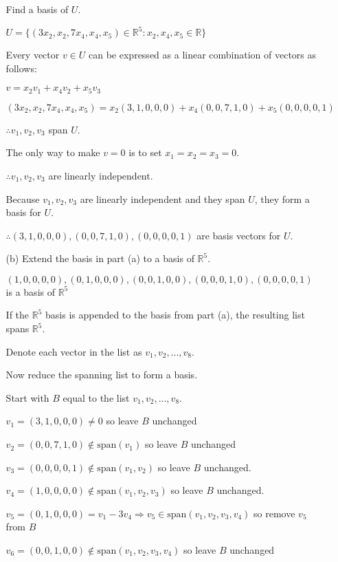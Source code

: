 \documentclass[fleqn]{article}
\begin{document}
\begin{enumerate}[nolistsep]
\begin{enumerate}[nolistsep]
				Find a basis of $U$.
				
				$U = \{(3x_2, x_2, 7x_4, x_4, x_5) \in \mathbb{R}^5 : x_2, x_4, x_5 \in \mathbb{R}\}$
				
				Every vector $v \in U$ can be expressed as a linear combination of vectors as follows:
				
				$v = x_2v_1 + x_4v_2 + x_5v_3$
				
				$(3x_2, x_2, 7x_4, x_4, x_5) = x_2(3, 1, 0, 0, 0) + x_4(0, 0, 7, 1, 0) + x_5(0, 0, 0, 0, 1)$
				
				$\therefore v_1, v_2, v_3$ span $U$.
									
				The only way to make $v = 0$ is to set $x_1 = x_2 = x_3 = 0$.
				
				$\therefore v_1, v_2, v_3$ are linearly independent.
				
				Because $v_1, v_2, v_3$ are linearly independent and they span $U$, they form a basis for $U$.
				
				$\therefore (3, 1, 0, 0, 0), (0, 0, 7, 1, 0), (0, 0, 0, 0, 1)$ are basis vectors for $U$.
				
				\item[(b)] Extend the basis in part (a) to a basis of $\mathbb{R}^5$.
				
				$(1, 0, 0, 0, 0), (0, 1, 0, 0, 0), (0, 0, 1, 0, 0), (0, 0, 0, 1, 0), (0, 0, 0, 0, 1)$ is a basis of $\mathbb{R}^5$
				
				If the $\mathbb{R}^5$ basis is appended to the basis from part (a), the resulting list spans $\mathbb{R}^5$.
				   
				Denote each vector in the list as $v_1, v_2, ..., v_8$.
				
				Now reduce the spanning list to form a basis.
				
				Start with $B$ equal to the list $v_1, v_2, ..., v_8$.
				
				$v_1 = (3, 1, 0, 0, 0) \neq 0$ so leave $B$ unchanged
				
				$v_2 = (0, 0, 7, 1, 0) \not\in \text{span}(v_1)$ so leave $B$ unchanged
				
				$v_3 = (0, 0, 0, 0, 1) \not\in \text{span}(v_1, v_2)$ so leave $B$ unchanged.
				
				$v_4 = (1, 0, 0, 0, 0) \not\in \text{span}(v_1, v_2, v_3)$ so leave $B$ unchanged.
				
				$v_5 = (0, 1, 0, 0, 0) = v_1 - 3v_4 \Rightarrow v_5 \in \text{span}(v_1, v_2, v_3, v_4)$ so remove $v_5$ from $B$
				
				$v_6 = (0, 0, 1, 0, 0) \not\in \text{span}(v_1, v_2, v_3, v_4)$ so leave $B$ unchanged
				

\end{enumerate}
\end{enumerate}
\end{document}
